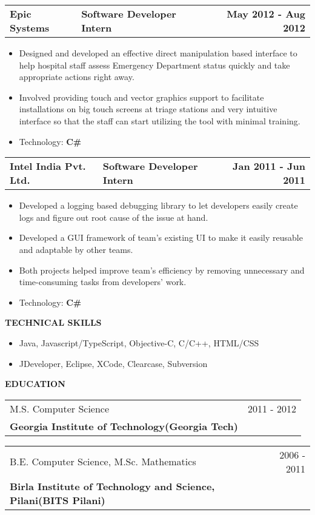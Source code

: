 \documentclass[a4paper]{article}
\makeatletter
\newcommand{\resumesection}[1]{
	\vspace*{-0.5\baselineskip}
	\begin{flushleft}
		\large{\textbf{\uppercase{#1}}}
	\end{flushleft}
} %
\newcommand{\experiencesubsection}[3]{
	\begin{tabular*}{1.0\textwidth}{@{\extracolsep{\fill}} p{7cm} l r}
		\textbf{#1} & \textbf{#2} & \textbf{#3}
	\end{tabular*}
} %
\newcommand{\educationsubsection}[4]{
	\begin{tabular*}{1.0\textwidth}{@{\extracolsep{\fill}} l r}
		#1 & #2 \\
		\textbf{#3} & #4\\
	\end{tabular*}
} %
\newcommand{\techitem}[1]{\item Technology: \textbf{#1}} %
\newcommand{\customitemizespacing}{\addtolength{\itemsep}{-0.5\baselineskip}}
\makeatother
\begin{document}
\experiencesubsection{Epic Systems}{Software Developer Intern}{May 2012 - Aug 2012}
\begin{itemize}
	\item Designed and developed an effective direct manipulation based interface to help hospital staff assess Emergency Department status quickly and take appropriate actions right away.
	\item Involved providing touch and vector graphics support to facilitate installations on big touch screens at triage stations and very intuitive interface so that the staff can start utilizing the tool with minimal training.
	\techitem{C\#}
\end{itemize}

\experiencesubsection{Intel India Pvt. Ltd.}{Software Developer Intern}{Jan 2011 - Jun 2011}
\begin{itemize}
	\item Developed a logging based debugging library to let developers easily create logs and figure out root cause of the issue at hand.
	\item Developed a GUI framework of team's existing UI to make it easily reusable and adaptable by other teams.
	\item Both projects helped improve team's efficiency by removing unnecessary and time-consuming tasks from developers' work.
	\techitem{C\#}
\end{itemize}


\resumesection{Technical Skills}
\begin{itemize}
	\item Java, Javascript/TypeScript, Objective-C, C/C++, HTML/CSS
	\item JDeveloper, Eclipse, XCode, Clearcase, Subversion
\end{itemize}

\resumesection{Education}
\educationsubsection{M.S. Computer Science}{2011 - 2012}{Georgia Institute of Technology(Georgia Tech)}{}
\newline
\educationsubsection{B.E. Computer Science, M.Sc. Mathematics}{2006 - 2011}{Birla Institute of Technology and Science, Pilani(BITS Pilani)}{}
\end{document}
